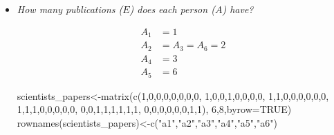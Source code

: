 \documentclass[
  notitlepage,
  onecolumn,
  openany]{book}
\newenvironment{Shaded}{\begin{snugshade}}{\end{snugshade}}
\newcommand{\AttributeTok}[1]{\textcolor[rgb]{0.77,0.63,0.00}{#1}}
\newcommand{\ConstantTok}[1]{\textcolor[rgb]{0.00,0.00,0.00}{#1}}
\newcommand{\DecValTok}[1]{\textcolor[rgb]{0.00,0.00,0.81}{#1}}
\newcommand{\FunctionTok}[1]{\textcolor[rgb]{0.00,0.00,0.00}{#1}}
\newcommand{\NormalTok}[1]{#1}
\newcommand{\OtherTok}[1]{\textcolor[rgb]{0.56,0.35,0.01}{#1}}
\newcommand{\StringTok}[1]{\textcolor[rgb]{0.31,0.60,0.02}{#1}}
\begin{document}
\begin{itemize}
\item
  \emph{How many publications (\(E\)) does each person (\(A\)) have?}

  \[
    \begin{aligned}
    A_1 &= 1 \\
    A_2 &= A_3 = A_6 = 2 \\
    A_4 &= 3 \\
    A_5 &= 6
    \end{aligned}
    \]

\begin{Shaded}
\begin{Highlighting}[]
\NormalTok{scientists\_papers}\OtherTok{\textless{}{-}}\FunctionTok{matrix}\NormalTok{(}\FunctionTok{c}\NormalTok{(}\DecValTok{1}\NormalTok{,}\DecValTok{0}\NormalTok{,}\DecValTok{0}\NormalTok{,}\DecValTok{0}\NormalTok{,}\DecValTok{0}\NormalTok{,}\DecValTok{0}\NormalTok{,}\DecValTok{0}\NormalTok{,}\DecValTok{0}\NormalTok{,}
                            \DecValTok{1}\NormalTok{,}\DecValTok{0}\NormalTok{,}\DecValTok{0}\NormalTok{,}\DecValTok{1}\NormalTok{,}\DecValTok{0}\NormalTok{,}\DecValTok{0}\NormalTok{,}\DecValTok{0}\NormalTok{,}\DecValTok{0}\NormalTok{,}
                            \DecValTok{1}\NormalTok{,}\DecValTok{1}\NormalTok{,}\DecValTok{0}\NormalTok{,}\DecValTok{0}\NormalTok{,}\DecValTok{0}\NormalTok{,}\DecValTok{0}\NormalTok{,}\DecValTok{0}\NormalTok{,}\DecValTok{0}\NormalTok{,}
                            \DecValTok{1}\NormalTok{,}\DecValTok{1}\NormalTok{,}\DecValTok{1}\NormalTok{,}\DecValTok{0}\NormalTok{,}\DecValTok{0}\NormalTok{,}\DecValTok{0}\NormalTok{,}\DecValTok{0}\NormalTok{,}\DecValTok{0}\NormalTok{,}
                            \DecValTok{0}\NormalTok{,}\DecValTok{0}\NormalTok{,}\DecValTok{1}\NormalTok{,}\DecValTok{1}\NormalTok{,}\DecValTok{1}\NormalTok{,}\DecValTok{1}\NormalTok{,}\DecValTok{1}\NormalTok{,}\DecValTok{1}\NormalTok{,}
                            \DecValTok{0}\NormalTok{,}\DecValTok{0}\NormalTok{,}\DecValTok{0}\NormalTok{,}\DecValTok{0}\NormalTok{,}\DecValTok{0}\NormalTok{,}\DecValTok{0}\NormalTok{,}\DecValTok{1}\NormalTok{,}\DecValTok{1}\NormalTok{),}
                          \DecValTok{6}\NormalTok{,}\DecValTok{8}\NormalTok{,}\AttributeTok{byrow=}\ConstantTok{TRUE}\NormalTok{)}
\FunctionTok{rownames}\NormalTok{(scientists\_papers)}\OtherTok{\textless{}{-}}\FunctionTok{c}\NormalTok{(}\StringTok{"a1"}\NormalTok{,}\StringTok{"a2"}\NormalTok{,}\StringTok{"a3"}\NormalTok{,}\StringTok{"a4"}\NormalTok{,}\StringTok{"a5"}\NormalTok{,}\StringTok{"a6"}\NormalTok{)}

\end{Highlighting}
\end{Shaded}
\end{itemize}
\end{document}
